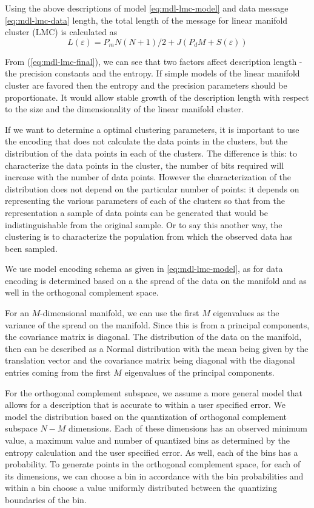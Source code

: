 Using the above descriptions of model \eqref{eq:mdl-lmc-model} and
data message \eqref{eq:mdl-lmc-data} length, the total length of
the message for linear manifold cluster (LMC) is calculated as
\begin{equation} \label{eq:mdl-lmc-final}
L(\varepsilon) = P_m N(N+1)/2 + J(P_d M  + S(\varepsilon))
\end{equation}

From (\ref{eq:mdl-lmc-final}), we can see that two factors affect description
length - the precision constants and the entropy.
If simple models of the linear manifold cluster are favored then the entropy and
the precision parameters should be proportionate. It would allow stable growth
of the description length with respect to the size and the dimensionality of
the linear manifold cluster.

If we want to determine a optimal clustering parameters, it is important
to use the encoding that does not calculate the data points in the clusters,
but the distribution of the data points in each of the clusters.
The difference is this: to characterize the data points in the cluster,
the number of bits required will increase with the number of data points.
However the characterization of the distribution does not depend on
the particular number of points: it depends on representing the various
parameters of each of the clusters so that from the representation a sample of
data points can be generated that would be indistinguishable from
the original sample. Or to say this another way, the clustering is
to characterize the population from which the observed data has been sampled.

We use model encoding schema as given in \eqref{eq:mdl-lmc-model}, as for data
encoding is determined based on a the spread of the data on the manifold and
as well in the orthogonal complement space.

For an $M$-dimensional manifold, we can use the first $M$ eigenvalues as the
variance of the spread on the manifold. Since this is from a principal
components, the covariance matrix is diagonal. The distribution of the data on
the manifold, then can be described as a Normal distribution with the mean
being given by the translation vector and the covariance matrix being
diagonal with the diagonal entries coming from the first $M$ eigenvalues
of the principal components.

For the orthogonal complement subspace, we assume a more general model that
allows for a description that is accurate to within a user specified error.
We model the distribution based on the quantization of orthogonal complement
subspace $N-M$ dimensions. Each of these dimensions has an observed minimum
value, a maximum value and number of quantized bins as determined by the entropy
calculation and the user specified error. As well, each of the bins has
a probability. To generate points in the orthogonal complement space,
for each of its dimensions, we can choose a bin in accordance with the bin
probabilities and within a bin choose a value uniformly distributed between
the quantizing boundaries of the bin.

